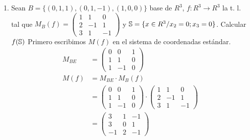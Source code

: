 \documentclass[../practica.root.tex]{subfiles}
\begin{document}
\begin{enumerate}
    \item Sean $B = \{(0,1,1),(0,1,-1),(1,0,0)\}$ base de $R^3$, $f : R^3 \to R^3$ la t. l. tal que $M_B(f)=\begin{pmatrix}
                  1 & 1 & 0 \\ 2 & -1 & 1 \\ 3 & 1 & -1
              \end{pmatrix}$ y $\S = \{x \in R^3 / x_2 = 0; x_3 = 0\}$. Calcular $f(\S)$
          Primero escribimos $M(f)$ en el sistema de coordenadas estándar.
          \begin{align*}
              M_{BE} & =\begin{pmatrix}
                  0 & 0  & 1 \\
                  1 & 1  & 0 \\
                  1 & -1 & 0
              \end{pmatrix}      \\
              M(f)   & =M_{BE}\cdot M_B(f)              \\
                     & =\begin{pmatrix}
                  0 & 0  & 1 \\
                  1 & 1  & 0 \\
                  1 & -1 & 0
              \end{pmatrix}\cdot
              \begin{pmatrix}
                  1 & 1  & 0  \\
                  2 & -1 & 1  \\
                  3 & 1  & -1
              \end{pmatrix}                \\
                     & =\begin{pmatrix}
                  3  & 1 & -1 \\
                  3  & 0 & 1  \\
                  -1 & 2 & -1
              \end{pmatrix}
          \end{align*}


\end{enumerate}
\end{document}
